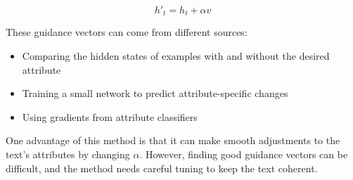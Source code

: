 \begin{equation}
    h'_t = h_t + \alpha v
\end{equation}

These guidance vectors can come from different sources:
\begin{itemize}
    \item Comparing the hidden states of examples with and without the desired attribute
    \item Training a small network to predict attribute-specific changes
    \item Using gradients from attribute classifiers
\end{itemize}

One advantage of this method is that it can make smooth adjustments to the text's attributes by changing $\alpha$. However, finding good guidance vectors can be difficult, and the method needs careful tuning to keep the text coherent.